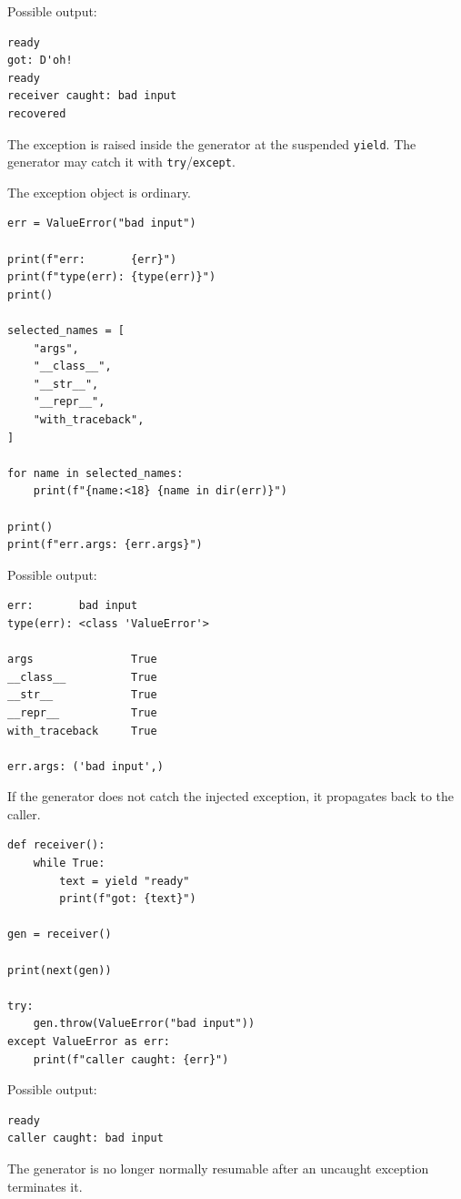 Possible output:

\begin{verbatim}
ready
got: D'oh!
ready
receiver caught: bad input
recovered
\end{verbatim}

The exception is raised inside the generator at the suspended \texttt{yield}. The generator may catch it with \texttt{try}/\texttt{except}.

The exception object is ordinary.

\begin{verbatim}
err = ValueError("bad input")

print(f"err:       {err}")
print(f"type(err): {type(err)}")
print()

selected_names = [
    "args",
    "__class__",
    "__str__",
    "__repr__",
    "with_traceback",
]

for name in selected_names:
    print(f"{name:<18} {name in dir(err)}")

print()
print(f"err.args: {err.args}")
\end{verbatim}

Possible output:

\begin{verbatim}
err:       bad input
type(err): <class 'ValueError'>

args               True
__class__          True
__str__            True
__repr__           True
with_traceback     True

err.args: ('bad input',)
\end{verbatim}

If the generator does not catch the injected exception, it propagates back to the caller.

\begin{verbatim}
def receiver():
    while True:
        text = yield "ready"
        print(f"got: {text}")

gen = receiver()

print(next(gen))

try:
    gen.throw(ValueError("bad input"))
except ValueError as err:
    print(f"caller caught: {err}")
\end{verbatim}

Possible output:

\begin{verbatim}
ready
caller caught: bad input
\end{verbatim}

The generator is no longer normally resumable after an uncaught exception terminates it.

